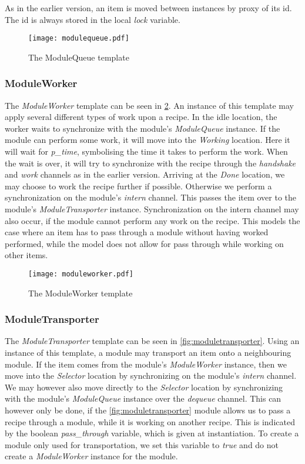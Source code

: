 As in the earlier version, an item is moved between instances by proxy of its id. The id is always stored in the local \emph{lock} variable.   

\begin{figure}[h]
\centering
\texttt{[image: modulequeue.pdf]}
\caption{The ModuleQueue template}
\label{fig:modulequeue}
\end{figure}


\subsubsection{ModuleWorker}\label{subs:moduleworker}
The \emph{ModuleWorker} template can be seen in \cref{fig:moduleworker}. An instance of this template may apply several different types of work upon a recipe. In the idle location, the worker waits to synchronize with the module's \emph{ModuleQueue} instance. If the module can perform some work, it will move into the \emph{Working} location. Here it will wait for \emph{p\_time}, symbolising the time it takes to perform the work. When the wait is over, it will try to synchronize with the recipe through the \emph{handshake} and \emph{work} channels as in the earlier version. Arriving at the \emph{Done}  location, we may choose to work the recipe further if possible. Otherwise we perform a synchronization on the module's \emph{intern} channel. This passes the item over to the module's \emph{ModuleTransporter} instance. Synchronization on the intern channel may also occur, if the module cannot perform any work on the recipe. This models the case where an item has to pass through a module without having worked performed, while the model does not allow for pass through while working on other items.

\begin{figure}[h]
\centering
\texttt{[image: moduleworker.pdf]}
\caption{The ModuleWorker template}
\label{fig:moduleworker}
\end{figure}

\subsubsection{ModuleTransporter}
The \emph{ModuleTransporter} template can be seen in \cref{fig:moduletransporter}. Using an instance of this template, a module may transport an item onto a neighbouring module. If the item comes from the module's \emph{ModuleWorker} instance, then we move into the \emph{Selector} location by synchronizing on the module's \emph{intern} channel. We may however also move directly to the \emph{Selector} location by synchronizing with the module's \emph{ModuleQueue} instance over the \emph{dequeue} channel. This can however only be done, if the \cref{fig:moduletransporter} module allows us to pass a recipe through a module, while it is working on another recipe. This is indicated by the boolean \emph{pass\_through} variable, which is given at instantiation. To create a module only used for transportation, we set this variable to \emph{true} and do not create a \emph{ModuleWorker} instance for the module. 

